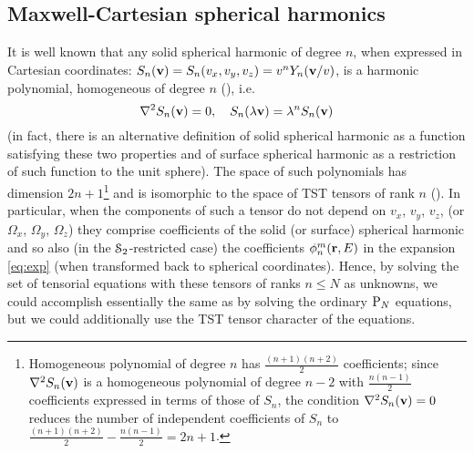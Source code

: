 \subsection{Maxwell-Cartesian spherical harmonics}\label{sec:MCSH}
It is well known that any solid spherical harmonic of degree $n$, when expressed in Cartesian coordinates: $S_n(\mathbf{v}) =
S_n(v_x, v_y, v_z) = v^n Y_n(\mathbf{v}/v)$, is a harmonic polynomial, homogeneous of degree $n$ (\cite[Art. 110]{Byerly}),
i.e.
$$
  \nabla^2 S_n(\mathbf{v}) = 0,\quad S_n(\lambda\mathbf{v}) = \lambda^n S_n(\mathbf{v})
$$ (in fact, there is an alternative definition of solid spherical harmonic as a function satisfying these two
properties and of surface spherical harmonic as a restriction of such function to the unit sphere). The space of such
polynomials has dimension $2n + 1$\footnote{Homogeneous polynomial of degree $n$ has $\frac{(n+1)(n+2)}{2}$
coefficients; since $\nabla^2 S_n(\mathbf{v})$ is a homogeneous polynomial of degree $n-2$ with $\frac{n(n-1)}{2}$ coefficients
expressed in terms of those of $S_n$, the condition $\nabla^2 S_n(\mathbf{v}) = 0$ reduces the number of independent coefficients
of $S_n$ to $\frac{(n+1)(n+2)}{2} - \frac{n(n-1)}{2} = 2n + 1$.}\label{pg:indepc} and is isomorphic to the space of TST
tensors of rank $n$ (\cite{Sam}).
In particular, when the components of such a tensor do not depend on $v_x$, $v_y$, $v_z$, (or $\Omega_x$, $\Omega_y$,
$\Omega_z$) they comprise coefficients of the solid (or surface) spherical harmonic and so also (in the
$\mathcal{S}_2$-restricted case) the coefficients $\phi_{n}^{m}(\mathbf{r},E)$ in the expansion \eqref{eq:exp} (when transformed
back to spherical coordinates). Hence, by solving the set of tensorial equations with these tensors of ranks $n \leq N$
as unknowns, we could accomplish essentially the same as by solving the ordinary $\text{P}_{N}$ equations, but we could
additionally use the TST tensor character of the equations.

